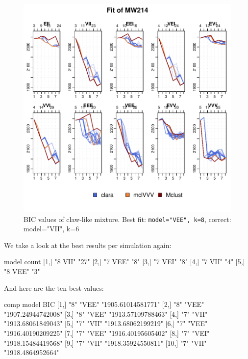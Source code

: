 \begin{figure}[h!]
    \begin{Rgraph}[0.9]
\includegraphics{chapter3-figMW214bic}
    \caption{BIC values of claw-like mixture. Best fit: {\tt model="VEE", k=8},
             correct: {model="VII", k=6}}
    \label{}
    \end{Rgraph}
\end{figure}

We take a look at the best results per simulation again:

\begin{Schunk}
\begin{Soutput}
     model   count
[1,] "8 VII" "27" 
[2,] "7 VEE" "8"  
[3,] "7 VEI" "8"  
[4,] "7 VII" "4"  
[5,] "8 VEE" "3"  
\end{Soutput}
\end{Schunk}

And here are the ten best values:

\begin{Schunk}
\begin{Soutput}
      comp model BIC               
 [1,] "8"  "VEE" "1905.61014581771"
 [2,] "8"  "VEE" "1907.24944742008"
 [3,] "8"  "VEE" "1913.57109788463"
 [4,] "7"  "VII" "1913.68061849043"
 [5,] "7"  "VII" "1913.68062199219"
 [6,] "7"  "VEE" "1916.40190209225"
 [7,] "7"  "VEE" "1916.40195605402"
 [8,] "7"  "VEI" "1918.15484419568"
 [9,] "7"  "VII" "1918.35924550811"
[10,] "7"  "VII" "1918.4864952664" 
\end{Soutput}
\end{Schunk}


